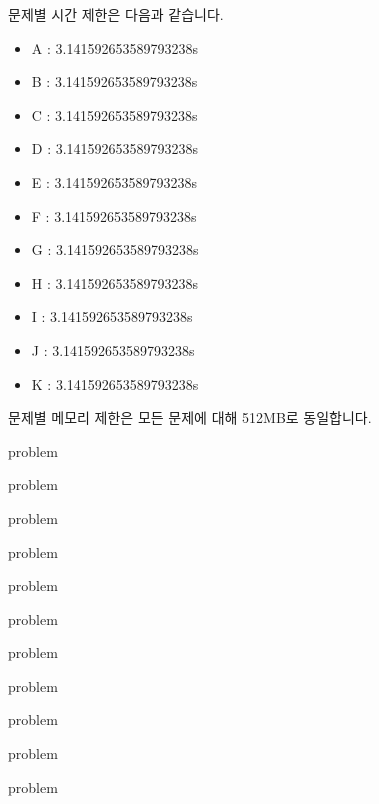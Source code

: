 \documentclass[11pt,a4paper,oneside,final]{article}
\begin{document}
\newpage
문제별 시간 제한은 다음과 같습니다.

\begin{itemize}
\item A : 3.141592653589793238s
\item B : 3.141592653589793238s
\item C : 3.141592653589793238s
\item D : 3.141592653589793238s
\item E : 3.141592653589793238s
\item F : 3.141592653589793238s
\item G : 3.141592653589793238s
\item H : 3.141592653589793238s
\item I : 3.141592653589793238s
\item J : 3.141592653589793238s
\item K : 3.141592653589793238s
\end{itemize}

문제별 메모리 제한은 모든 문제에 대해 512MB로 동일합니다.

\newpage

{problem}

{problem}

{problem}

{problem}

{problem}

{problem}

{problem}

{problem}

{problem}

{problem}

{problem}
\end{document}
